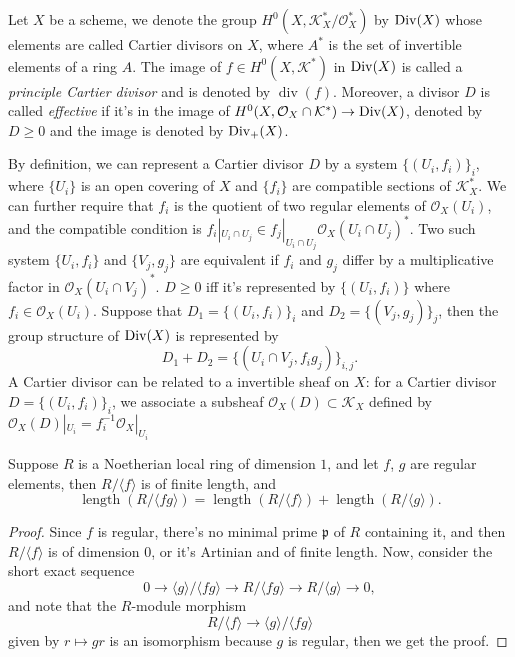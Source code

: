 \begin{defi}
Let $X$ be a scheme, we denote the group $H^0(X,\mathcal K^*_X/
\mathcal O_X^*)$ by $\operatorname{Div}(X)$ whose elements are called Cartier divisors
on $X$, where $A^*$ is the set of invertible elements of a ring $A$.
The image of $f\in H^0(X,\mathcal K^*)$ in $\operatorname{Div}(X)$ is called a \emph{principle
Cartier divisor} and is denoted by $\operatorname{div}(f)$. Moreover, a divisor
$D$ is called \emph{effective} if it's in the image of 
$H^0(X,\mathcal O_X\cap \mathcal K^*)\to \operatorname{Div}(X)$, denoted by $D\geq 0$
and the image is denoted by $\operatorname{Div}_+(X)$.
\end{defi}

By definition, we can represent a Cartier divisor $D$ by a system $\{(U_i,f_i)\}_i$, 
where $\{U_i\}$ is an open covering of $X$ and $\{f_i\}$ are compatible sections of 
$\mathcal K^*_X$. We can further require that $f_i$ is the quotient of two regular 
elements of $\mathcal O_X(U_i)$, and the compatible condition is 
$f_i|_{U_i\cap U_j}\in f_j|_{U_i\cap U_j}\mathcal O_X(U_i\cap U_j)^*$.
Two such system $\{U_i,f_i\}$ and $\{V_j,g_j\}$ are equivalent if 
$f_i$ and $g_j$ differ by a multiplicative factor in $\mathcal O_X(U_i\cap V_j)^*$.
$D\geq 0$ iff it's represented by $\{(U_i,f_i)\}$ where $f_i\in \mathcal O_X(U_i)$.
Suppose that $D_1=\{(U_i,f_i)\}_i$ and $D_2=\{(V_j,g_j)\}_j$, then the group 
structure of $\operatorname{Div}(X)$ is represented by 
\[
	D_1+D_2=\{(U_i\cap V_j,f_ig_j)\}_{i,j}.
\]
A Cartier divisor can be related to a invertible sheaf on $X$: for a Cartier divisor 
$D=\{(U_i,f_i)\}_i$, we associate a subsheaf $\mathcal O_X(D)\subset \mathcal K_X$ 
defined by $\mathcal O_X(D)|_{U_i}=f_i^{-1}\mathcal O_X|_{U_i}$

\begin{lem}
Suppose $R$ is a Noetherian local ring of dimension $1$, and let $f$, $g$ are regular
elements, then $R/\langle f\rangle$ is of finite length, and 
\[
	\operatorname{length}(R/\langle fg\rangle) =
	\operatorname{length}(R/\langle f\rangle) +
	\operatorname{length}(R/\langle g\rangle).
\]
\end{lem}

\begin{proof}
Since $f$ is regular, there's no minimal prime $\mathfrak p$ of $R$ containing it,
and then $R/\langle f\rangle$ is of dimension $0$, or it's Artinian and of finite
length. Now, consider the short exact sequence
\[
	0\to \langle g\rangle /\langle fg\rangle \to 
	R/\langle fg\rangle\to R/\langle g\rangle \to 0,
\]
and note that the $R$-module morphism 
\[
	R/\langle f\rangle \to\langle g\rangle/\langle fg\rangle
\]
given by $r\mapsto gr$ is an isomorphism because $g$ is regular, then we get the proof.
\end{proof}

